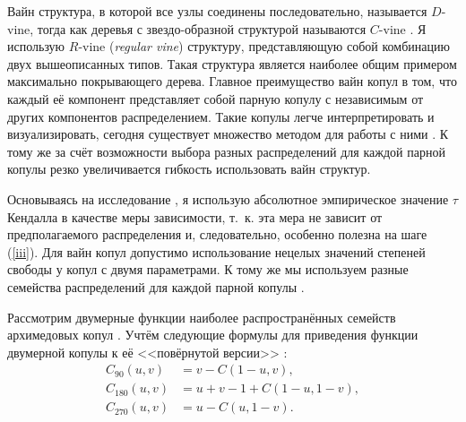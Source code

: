 Вайн структура, в которой все узлы соединены последовательно, называется $D$-vine, тогда как деревья с звездо-образной структурой называются $C$-vine \cite{Dissmann2013}. 
Я использую $R$-vine (\textit{regular vine}) структуру, представляющую собой комбинацию двух вышеописанных типов. 
Такая структура является наиболее общим примером максимально покрывающего дерева.
Главное преимущество вайн копул в том, что каждый её компонент представляет собой парную копулу с независимым от других компонентов распределением.
Такие копулы легче интерпретировать и визуализировать, сегодня существует множество методом для работы с ними \cite{Cooke2015, Czado2010, Dissmann2013}. 
К тому же за счёт возможности выбора разных распределений для каждой парной копулы резко увеличивается гибкость использовать вайн структур.

Основываясь на исследование \cite{Dissmann2013}, я использую абсолютное эмпирическое значение $\tau$ Кендалла в качестве меры зависимости, т.~к. эта мера не зависит от предполагаемого распределения и, следовательно, особенно полезна на шаге (\ref{iii}).
Для вайн копул допустимо использование нецелых значений степеней свободы у копул с двумя параметрами. 
К тому же мы используем разные семейства распределений для каждой парной копулы \cite{Bel2010}.

Рассмотрим двумерные функции наиболее распространённых семейств архимедовых копул \cite{Joe1997}. Учтём следующие формулы для приведения функции двумерной копулы к её <<повёрнутой версии>> \cite{Brechmann2013}:
%
\begin{equation} \label{rotatedCop}
\begin{aligned}
    C_{90}(u,v) &= v - C(1 - u, v), \\
    C_{180}(u,v) &= u + v - 1 + C(1 - u,1 - v), \\
    C_{270}(u, v) &= u - C(u, 1 - v).
\end{aligned}
\end{equation}

